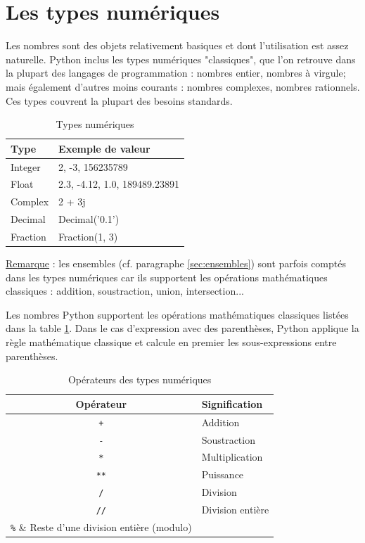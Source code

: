 \documentclass[12pt, a4paper]{article}
\begin{document}
\section{Les types numériques}
\label{sec:types_numeriques}
Les nombres sont des objets relativement basiques et dont l'utilisation est assez naturelle.  Python inclus les types numériques "classiques", que l'on retrouve dans la plupart des langages de programmation : nombres entier, nombres à virgule; mais également d'autres moins courants : nombres complexes, nombres rationnels. Ces types couvrent la plupart des besoins standards.

\begin{table}[H]
	\begin{center}
		\begin{tabular}{|l|l|}
			\hline
			\textbf{Type} & \textbf{Exemple de valeur} \\
			\hline
			Integer & 2, -3, 156235789 \\
			Float &  2.3, -4.12, 1.0, 189489.23891\\
			Complex & 2 + 3j \\
			Decimal & Decimal('0.1') \\
			Fraction & Fraction(1, 3) \\
			\hline
		\end{tabular}
		\caption{Types numériques}
	\end{center}
\end{table}

\underline{Remarque} : les ensembles (cf. paragraphe \ref{sec:ensembles}) sont parfois comptés dans les types numériques car ils supportent les opérations mathématiques classiques : addition, soustraction, union, intersection...

Les nombres Python supportent les opérations mathématiques classiques listées dans la table \ref{tab:operateurs_numerique}. Dans le cas d'expression avec des parenthèses, Python applique la règle mathématique classique et calcule en premier les sous-expressions entre parenthèses.

\begin{table}[H]
	\begin{center}
		\begin{tabular}{|c|l|}
			\hline
			\textbf{Opérateur} & \textbf{Signification} \\
			\hline
			\lstinline{+} & Addition \\
			\lstinline{-} & Soustraction\\
			\lstinline{*} & Multiplication \\
			\lstinline{**} & Puissance \\
			\lstinline{/} & Division \\
			\lstinline{//} & Division entière \\
			\lstinline{%} & Reste d'une division entière (modulo) \\
			\hline
		\end{tabular}
		\caption{Opérateurs des types numériques}
		\label{tab:operateurs_numerique}
	\end{center}
\end{table}
\end{document}
